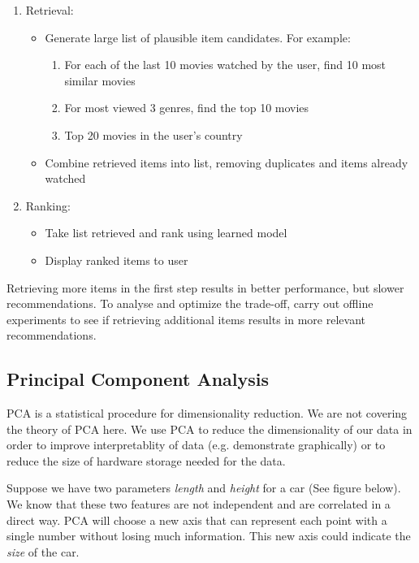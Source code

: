\documentclass[a4paper, 12pt]{book}
\begin{document}
\begin{enumerate}
    \item Retrieval:
    \begin{itemize}
        \item Generate large list of plausible item candidates. For example:
        \begin{enumerate}
            \item For each of the last 10 movies watched by the user, find 10 most similar movies
            \item For most viewed 3 genres, find the top 10 movies
            \item Top 20 movies in the user's country
        \end{enumerate}
        \item Combine retrieved items into list, removing duplicates and items already watched
    \end{itemize}
    \item Ranking:
    \begin{itemize}
        \item Take list retrieved and rank using learned model
        \item Display ranked items to user
    \end{itemize}
\end{enumerate}

Retrieving more items in the first step results in better performance, but slower recommendations. To analyse and optimize the trade-off, carry out offline experiments to see if retrieving additional items results in more relevant recommendations.

\subsection{Principal Component Analysis}

PCA is a statistical procedure for dimensionality reduction. We are not covering the theory of PCA here. We use PCA to reduce the dimensionality of our data in order to improve interpretablity of data (e.g. demonstrate graphically) or to reduce the size of hardware storage needed for the data.

Suppose we have two parameters \emph{length} and \emph{height} for a car (See figure below). We know that these two features are not independent and are correlated in a direct way. PCA will choose a new axis that can represent each point with a single number without losing much information. This new axis could indicate the \emph{size} of the car.
\end{document}
